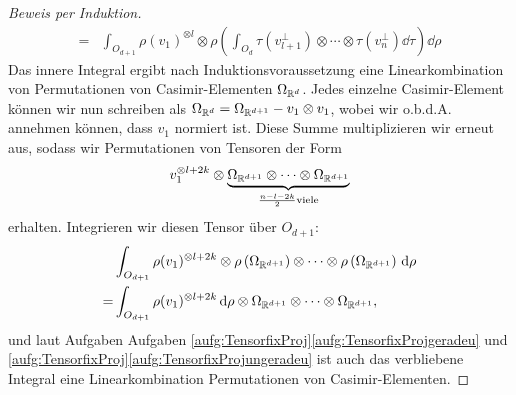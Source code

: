 \begin{proof}[Beweis per Induktion]
\begin{align*}
	= &\int_{O_{d+1}} \rho(v_1)^{\otimes l}\otimes \rho\left(\int_{O_{d}}\tau(v_{l+1}^\perp) \otimes \cdots \otimes \tau(v_n^\perp) \dd \tau \right) \dd \rho
\end{align*}
Das innere Integral ergibt nach Induktionsvoraussetzung eine Linearkombination von Permutationen von Casimir-Elementen $\Omega_{\mathbb{R}^d}$. Jedes einzelne Casimir-Element können wir nun schreiben als $\Omega_{\mathbb{R}^d} = \Omega_{\mathbb{R}^{d+1}} - v_1 \otimes v_1$, wobei wir o.b.d.A. annehmen können, dass $v_1$ normiert ist. Diese Summe multiplizieren wir erneut aus, sodass wir Permutationen von Tensoren der Form
\begin{align*}
	v_1^{\otimes l+2k} \otimes \underbrace{\Omega_{\mathbb{R}^{d+1}} \otimes \cdots \otimes \Omega_{\mathbb{R}^{d+1}}}_{\frac{n-l-2k}{2} \text{viele}}
\end{align*}
erhalten. Integrieren wir diesen Tensor über $O_{d+1}$: 
\begin{align*}
	&\int_{O_{d+1}} \rho(v_1)^{\otimes l+2k} \otimes \rho\left(\Omega_{\mathbb{R}^{d+1}}\right) \otimes \cdots \otimes \rho\left(\Omega_{\mathbb{R}^{d+1}}\right)\,\textrm{d} \rho \\
	=& \int_{O_{d+1}} \rho(v_1)^{\otimes l+2k} \,\textrm{d} \rho \otimes \Omega_{\mathbb{R}^{d+1}} \otimes \cdots \otimes \Omega_{\mathbb{R}^{d+1}},
\end{align*}
und laut Aufgaben Aufgaben \ref{aufg:TensorfixProj}\ref{aufg:TensorfixProjgeradeu} und \ref{aufg:TensorfixProj}\ref{aufg:TensorfixProjungeradeu} ist auch das verbliebene Integral eine Linearkombination Permutationen von Casimir-Elementen.
\end{proof}

